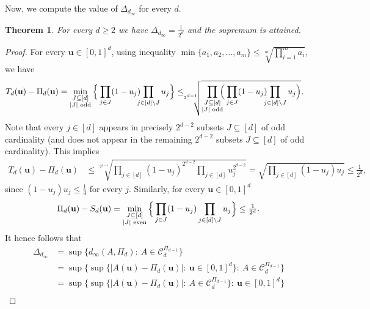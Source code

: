 \documentclass[12pt,a4paper]{amsart}
\newtheorem{theorem}{Theorem}[section]
\theoremstyle{definition}
\newcommand{\kc}{\mathcal{C}}
\begin{document}
Now, we compute the value of $\Delta_{d_\infty}$ for every $d$.

\begin{theorem}\label{thm:maindinf}
For every $d \geq 2$ we have $\Delta_{d_\infty}=\frac{1}{2^d}$ and the supremum is attained.
\end{theorem}

\begin{proof}
For every $\mathbf{u} \in [0,1]^d$, using inequality $\min\{a_1, a_2, \ldots, a_m\} \le \sqrt[m]{\prod_{i=1}^m a_i}$, we have   
\begin{align*}
    T_d(\mathbf{u}) - \Pi_d(\mathbf{u}) &= \min_{\substack{J \subseteq [d]\\ |J| \textup{ odd}}} \Big\{\prod_{j \in J} (1-u_j) \hspace{-2mm} \prod_{j \in [d] \setminus J} u_j\Big\} 
    \le \hspace{-2mm} \sqrt[2^{d-1}]{\prod_{\substack{J \subseteq [d]\\ |J| \textup{ odd}}} \hspace{-2mm} \Big(\prod_{j \in J} (1-u_j) \hspace{-2mm} \prod_{j \in [d] \setminus J} u_j\Big)}.
\end{align*}
Note that every $j \in [d]$ appears in precisely $2^{d-2}$ subsets $J \subseteq [d]$ of odd cardinality (and does not appear in the remaining $2^{d-2}$ subsets $J \subseteq [d]$ of odd cardinality). This implies
\begin{align*}
     T_d(\mathbf{u}) - \Pi_d(\mathbf{u})    &\le \sqrt[2^{d-1}]{\prod_{j \in [d]} (1-u_j)^{2^{d-2}} \prod_{j \in [d]} u_j^{2^{d-2}}} = \sqrt{\prod_{j \in [d]} (1-u_j)u_j} \le \tfrac{1}{2^d},
\end{align*}
since $(1-u_j)u_j \le \tfrac14$ for every $j$. Similarly, for every $\mathbf{u} \in [0,1]^d$
$$\Pi_d(\mathbf{u}) - S_d(\mathbf{u}) = \min_{\substack{J \subseteq [d]\\ |J| \textup{ even}}} \Big\{\prod_{j \in J} (1-u_j) \prod_{j \in [d] \setminus J} u_j\Big\} \le \tfrac{1}{2^d}.$$
It hence follows that
\begin{align*}
\Delta_{d_\infty} &= \sup\Big\{d_\infty(A,\Pi_d):\ A \in \kc_d^{\Pi_{d-1}}\Big\} \\
&= \sup\Big\{\sup\{|A(\mathbf{u}) - \Pi_d(\mathbf{u})|:\ \mathbf{u} \in [0,1]^d\}:\ A \in \kc_d^{\Pi_{d-1}}\Big\}  \\
&= \sup\Big\{\sup\big\{|A(\mathbf{u}) - \Pi_d(\mathbf{u})|:\ A \in \kc_d^{\Pi_{d-1}}\big\}:\ \mathbf{u} \in [0,1]^d\Big\}  \\

\end{align*}
\end{proof}
\end{document}
